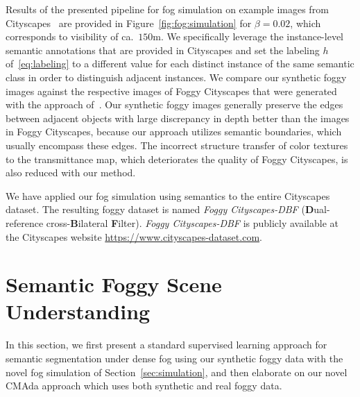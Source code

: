 \documentclass[twocolumn]{svjour3}          \smartqed  \usepackage{graphicx}
\begin{document}
Results of the presented pipeline for fog simulation on example images from Cityscapes~\cite{Cityscapes} are provided in Figure~\ref{fig:fog:simulation} for $\beta = 0.02$, which corresponds to visibility of ca.\ $150\text{m}$. We specifically leverage the instance-level semantic annotations that are provided in Cityscapes and set the labeling $h$ of~\eqref{eq:labeling} to a different value for each distinct instance of the same semantic class in order to distinguish adjacent instances. We compare our synthetic foggy images against the respective images of Foggy Cityscapes that were generated with the approach of~\cite{SFSU_synthetic}. Our synthetic foggy images generally preserve the edges between adjacent objects with large discrepancy in depth better than the images in Foggy Cityscapes, because our approach utilizes semantic boundaries, which usually encompass these edges. The incorrect structure transfer of color textures to the transmittance map, which deteriorates the quality of Foggy Cityscapes, is also reduced with our method. 

We have applied our fog simulation using semantics to the entire Cityscapes dataset. The resulting foggy dataset is named \emph{Foggy Cityscapes-DBF} (\textbf{D}ual-reference cross-\textbf{B}ilateral \textbf{F}ilter). \emph{Foggy Cityscapes-DBF} is publicly available at the Cityscapes website \url{https://www.cityscapes-dataset.com}.

\section{Semantic Foggy Scene Understanding}
\label{sec:semantic:learning} 

In this section, we first present a standard supervised learning approach for semantic segmentation under dense fog using our synthetic foggy data with the novel fog simulation of Section~\ref{sec:simulation}, and then elaborate on our novel CMAda approach which uses both synthetic and real foggy data. 
\end{document}
